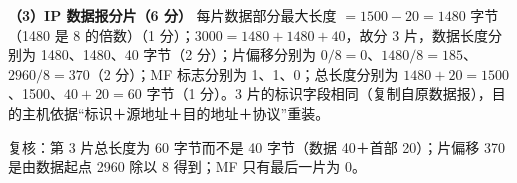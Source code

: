 \documentclass[a4paper,11pt]{article}
\begin{document}
\textbf{（3）IP 数据报分片（6 分）}
每片数据部分最大长度 $=1500-20=1480$ 字节（1480 是 8 的倍数）（1 分）；$3000=1480+1480+40$，故分 3 片，数据长度分别为 1480、1480、40 字节（2 分）；片偏移分别为 $0/8=0$、$1480/8=185$、$2960/8=370$（2 分）；MF 标志分别为 1、1、0；总长度分别为 $1480+20=1500$、1500、$40+20=60$ 字节（1 分）。3 片的标识字段相同（复制自原数据报），目的主机依据“标识＋源地址＋目的地址＋协议”重装。
\begin{analysis}复核：第 3 片总长度为 60 字节而不是 40 字节（数据 40＋首部 20）；片偏移 370 是由数据起点 2960 除以 8 得到；MF 只有最后一片为 0。\end{analysis}
\end{document}
